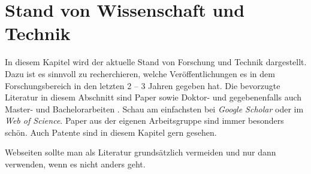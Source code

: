 


\section{Stand von Wissenschaft und Technik}

In diesem Kapitel wird der aktuelle Stand von Forschung und Technik dargestellt. Dazu ist es sinnvoll zu recherchieren, welche Veröffentlichungen es in dem Forschungsbereich in den letzten 2 -- 3 Jahren gegeben hat. Die bevorzugte Literatur in diesem Abschnitt sind Paper \cite{Peters2017,Peters2018,Bruggeman2013} sowie Doktor- und gegebenenfalls auch Master- und Bachelorarbeiten \cite{Hirschberg2017,Freier2013}. Schau am einfachsten bei \textit{Google Scholar} oder im \textit{Web of Science}. Paper aus der eigenen Arbeitsgruppe sind immer besonders schön. Auch Patente \cite{Liepack2011} sind in diesem Kapitel gern gesehen. 

Webseiten \cite{Northstar2018} sollte man als Literatur grundsätzlich vermeiden und nur dann verwenden, wenn es nicht anders geht.








